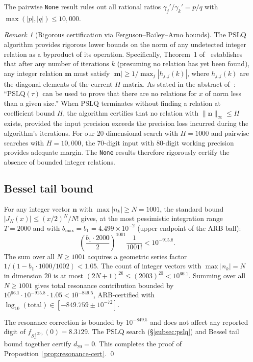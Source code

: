 \documentclass[12pt,reqno]{amsart}
\theoremstyle{plain}
\theoremstyle{definition}
\theoremstyle{remark}
\newtheorem{remark}[theorem]{Remark}
\begin{document}
\noindent The pairwise \texttt{None} result rules out all rational ratios
$\gamma_j'/\gamma_k' = p/q$ with $\max(|p|,|q|) \leq 10{,}000$.

\begin{remark}[Rigorous certification via Ferguson--Bailey--Arno bounds]
The PSLQ algorithm provides rigorous lower bounds on the norm of any undetected integer relation as a byproduct of its operation.  Specifically, Theorem~1 of~\cite{FBA1999} establishes that after any number of iterations $k$ (presuming no relation has yet been found), any integer relation $\mathbf{m}$ must satisfy $|\mathbf{m}| \geq 1/\max_j |h_{j,j}(k)|$, where $h_{j,j}(k)$ are the diagonal elements of the current $H$ matrix.  As stated in the abstract of~\cite{FBA1999}: ``PSLQ$(\tau)$ can be used to prove that there are no relations for $x$ of norm less than a given size.''  When PSLQ terminates without finding a relation at coefficient bound $H$, the algorithm certifies that no relation with $\|\mathbf{n}\|_\infty \leq H$ exists, provided the input precision exceeds the precision loss incurred during the algorithm's iterations.  For our 20-dimensional search with $H = 1000$ and pairwise searches with $H = 10{,}000$, the 70-digit input with 80-digit working precision provides adequate margin.  The \texttt{None} results therefore rigorously certify the absence of bounded integer relations.
\end{remark}

\subsection{Bessel tail bound}\label{subsec:bessel-tail}

For any integer vector $\mathbf{n}$ with $\max|n_k| \geq N = 1001$, the standard bound
$|J_N(x)| \leq (x/2)^N/N!$ gives, at the most pessimistic integration range $T = 2000$
and with $b_{\max} = b_1 = 4.499\times 10^{-2}$ (upper endpoint of the ARB ball):
\[
  \left(\frac{b_1 \cdot 2000}{2}\right)^{1001}\frac{1}{1001!} < 10^{-915.8}.
\]
The sum over all $N \geq 1001$ acquires a geometric series factor $1/(1 - b_1\cdot 1000/1002) < 1.05$.
The count of integer vectors with $\max|n_k| = N$ in dimension $20$ is at most
$(2N+1)^{20} \leq (2003)^{20} < 10^{66.1}$.  Summing over all $N \geq 1001$ gives total
resonance contribution bounded by $10^{66.1}\cdot 10^{-915.8} \cdot 1.05 < 10^{-849.5}$,
ARB-certified with $\log_{10}(\text{total}) \in [-849.759 \pm 10^{-72}]$.

The resonance correction is bounded by $10^{-849.5}$ and does not affect any
reported digit of $f_{S_L^{(20)}}(0) = 8.3129$.  The PSLQ search (\S\ref{subsec:pslq}) and Bessel tail bound together certify $d_{20} = 0$.  This completes the proof of Proposition~\ref{prop:resonance-cert}. \qed
\end{document}
